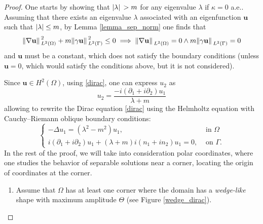 \begin{proof}
    One starts by showing that \(\abs*{\lambda}>m\) for any eigenvalue \(\lambda\) if \(\kappa = 0\) a.e.. Assuming that there exists an eigenvalue \(\lambda\) associated with an eigenfunction \(\mathbf{u}\) such that \(\abs{\lambda} \leq m\), by Lemma \ref{lemma_sep_norm} one finds that
    \[
    \norm*{\nabla \mathbf{u} }_{L^2(\Omega)}^2 + m \norm*{\gamma \mathbf{u}}_{L^2(\Gamma)}^2 \leq 0 \implies \norm*{\nabla \mathbf{u} }_{L^2(\Omega)} = 0 \land m \norm*{\gamma \mathbf{u}}_{L^2(\Gamma)} = 0
    \]
    and \(\mathbf{u}\) must be a constant, which does not satisfy the boundary conditions (unless \(\mathbf{u}=0\), which would satisfy the conditions above, but it is not considered).

    Since \(\mathbf{u} \in H^2(\Omega)\), using \eqref{dirac}, one can express \(u_2\) as
    \[
    u_2 = \frac{-i (\partial_1 + i\partial_2)u_1}{\lambda + m}
    \]
    allowing to rewrite the Dirac equation \eqref{dirac} using the Helmholtz equation with Cauchy–Riemann oblique boundary conditions:
    \begin{equation}\label{helm_system}
        \begin{cases}
            -\Delta u_1 = (\lambda^2 - m^2)u_1, & \text{ in } \Omega\\
             i (\partial_1 + i\partial_2)u_1 + (\lambda + m)i(n_1 + i n_2)u_1 = 0, & \text{ on } \Gamma.
        \end{cases}
    \end{equation}
    In the rest of the proof, we will take into consideration polar coordinates, where one studies the behavior of separable solutions near a corner, locating the origin of coordinates at the corner.

    \begin{enumerate}
    \item Assume that \(\Omega\) has at least one corner where the domain has a \textit{wedge-like} shape with maximum amplitude \(\Theta\) (see Figure \ref{wedge_dirac}).

    \usetikzlibrary{decorations.pathmorphing}
    \begin{figure}[H]
    \centering
\end{figure}
\end{enumerate}
\end{proof}
